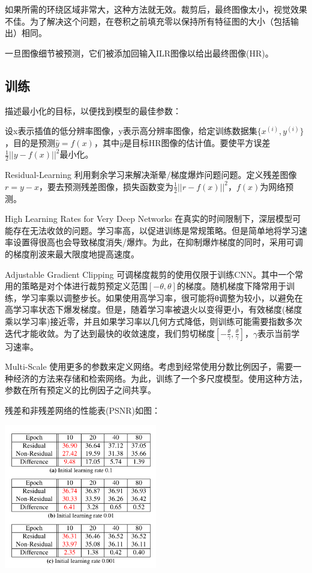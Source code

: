 \documentclass[UTF8,a4paper,10pt]{ctexrep}
\begin{document}
如果所需的环绕区域非常大，这种方法就无效。裁剪后，最终图像太小，视觉效果不佳。为了解决这个问题，在卷积之前填充零以保持所有特征图的大小（包括输出）相同。

一旦图像细节被预测，它们被添加回输入ILR图像以给出最终图像(HR)。

\subsection{训练}
描述最小化的目标，以便找到模型的最佳参数：

设x表示插值的低分辨率图像，y表示高分辨率图像，给定训练数据集$\{x^{(i)},y^{(i)}\}$，目的是预测$\hat{y}=f(x)$，其中$\hat{y}$是目标HR图像的估计值。要使平方误差$\frac{1}{2}||y-f(x)||^2$最小化。

Residual-Learning 利用剩余学习来解决渐晕/梯度爆炸问题问题。定义残差图像$r=y-x$，要去预测残差图像，损失函数变为$\frac{1}{2}||r-f(x)||^2$，$f(x)$为网络预测。

High Learning Rates for Very Deep Networks 在真实的时间限制下，深层模型可能存在无法收敛的问题。学习率高，以促进训练是常规策略。但是简单地将学习速率设置得很高也会导致梯度消失/爆炸。为此，在抑制爆炸梯度的同时，采用可调的梯度削波来最大限度地提高速度。

Adjustable Gradient Clipping 可调梯度裁剪的使用仅限于训练CNN。其中一个常用的策略是对个体进行裁剪预定义范围$[-\theta,\theta]$的梯度。随机梯度下降常用于训练，学习率乘以调整步长。如果使用高学习率，很可能将θ调整为较小，以避免在高学习率状态下爆发梯度。但是，随着学习率被退火以变得更小，有效梯度(梯度乘以学习率)接近零，并且如果学习率以几何方式降低，则训练可能需要指数多次迭代才能收敛。为了达到最快的收敛速度，我们剪切梯度$[-\frac{\theta}{\gamma},\frac{\theta}{\gamma}]$，$\gamma$表示当前学习速率。

Multi-Scale 使用更多的参数来定义网络。考虑到经常使用分数比例因子，需要一种经济的方法来存储和检索网络。为此，训练了一个多尺度模型。使用这种方法，参数在所有预定义的比例因子之间共享。

残差和非残差网络的性能表(PSNR)如图：

\includegraphics[width=0.5\textwidth]{figure/cancha.png}
\end{document}
